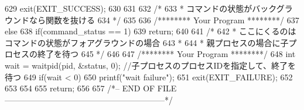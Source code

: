 \documentclass{procreport}
\begin{document}
\begin{verbatimtab}
{{   629			exit(EXIT_SUCCESS); 
   630		}
   631	
   632		/*
   633		 *  コマンドの状態がバックグラウンドなら関数を抜ける
   634		 */
   635	
   636		/******** Your Program ********/
   637		else{
   638			if(command_status == 1)
   639				return;
   640	
   641		/*
   642		 *  ここにくるのはコマンドの状態がフォアグラウンドの場合
   643		 *
   644		 *  親プロセスの場合に子プロセスの終了を待つ
   645		 */
   646	
   647		/******** Your Program ********/
   648			int wait = waitpid(pid, &status, 0); //子プロセスのプロセスIDを指定して、終了を待つ
   649			if(wait < 0){
   650				printf("wait failure\n");
   651				exit(EXIT_FAILURE);
   652			}
   653		}
   654		
   655		return;
   656	}
   657	/*-- END OF FILE -----------------------------------------------------------*/
\end{verbatimtab}
\end{document}
